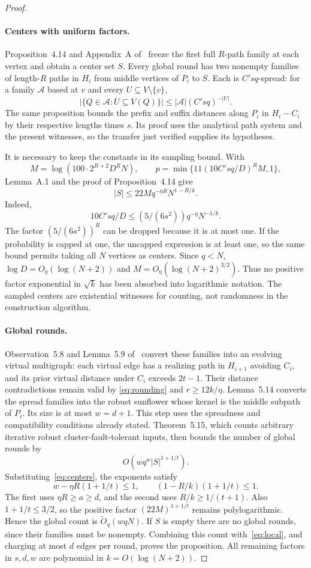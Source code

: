 \documentclass[acmsmall,11pt,screen,nonacm]{acmart}
\newcommand{\Ot}{\widetilde{O}}
\begin{document}
\begin{proof}
\paragraph{Centers with uniform factors.}
Proposition~4.14 and Appendix~A of~\cite{PPT26} freeze the first full
$R$-path family at each vertex and obtain a center set $S$. Every global
round has two nonempty families of length-$R$ paths in $H_i$ from middle
vertices of $P_i$ to $S$. Each is $C'sq$-spread: for a family
$\mathcal A$ based at $v$ and every $U\subseteq V\setminus\{v\}$,
\[
 |\{Q\in\mathcal A:U\subseteq V(Q)\}|\le
 |\mathcal A|(C'sq)^{-|U|}.
\]
The same proposition bounds the prefix and suffix distances along $P_i$
in $H_i-C_i$ by their respective lengths times $s$.
Its proof uses the analytical path system and the present witnesses, so
the transfer just verified supplies its hypotheses.

It is necessary to keep the constants in its sampling bound. With
\[
 M=\log(100\cdot2^{R+2}D^RN),\qquad
 p=\min\{11(10C'sq/D)^RM,1\},
\]
Lemma~A.1 and the proof of Proposition~4.14 give
\begin{equation}\label{eq:centers}
 |S|\le22M q^{-\eta R}N^{1-R/k}.
\end{equation}
Indeed,
\[
 10C'sq/D\le (5/(6s^2))q^{-\eta}N^{-1/k}.
\]
The factor $(5/(6s^2))^R$ can be dropped because it is at most one.
If the probability is capped at one, the uncapped expression is at least
one, so the same bound permits taking all $N$ vertices as centers.
Since $q<N$, $\log D=O_\eta(\log(N+2))$ and
$M=O_\eta(\log(N+2)^{3/2})$. Thus no positive factor exponential in
$\sqrt{k}$ has been absorbed into logarithmic notation. The sampled
centers are existential witnesses for counting, not randomness in the
construction algorithm.

\paragraph{Global rounds.}
Observation~5.8 and Lemma~5.9 of~\cite{PPT26} convert these families into
an evolving virtual multigraph: each virtual edge has a realizing path
in $H_{i+1}$ avoiding $C_i$, and its prior virtual distance under $C_i$
exceeds $2t-1$. Their distance contradictions remain valid by
\eqref{eq:rounding} and $r\ge12k/\eta$. Lemma~5.14 converts the spread
families into the robust sunflower whose kernel is the middle subpath
of $P_i$. Its size is at most $w=d+1$. This step uses the spreadness and
compatibility conditions already stated. Theorem~5.15, which counts
arbitrary iterative robust cluster-fault-tolerant inputs, then bounds
the number of global rounds by
\[
 O(wq^w|S|^{1+1/t}).
\]
Substituting~\eqref{eq:centers}, the exponents satisfy
\[
 w-\eta R(1+1/t)\le1,\qquad
 (1-R/k)(1+1/t)\le1.
\]
The first uses $\eta R\ge a\ge d$, and the second uses
$R/k\ge1/(t+1)$. Also $1+1/t\le3/2$, so the positive factor
$(22M)^{1+1/t}$ remains polylogarithmic. Hence the global count is
$\Ot_\eta(wqN)$. If $S$ is empty there are no global rounds, since their
families must be nonempty. Combining this count with~\eqref{eq:local},
and charging at most $d$ edges per round, proves the proposition. All
remaining factors in $s,d,w$ are polynomial in $k=O(\log(N+2))$.
\end{proof}
\end{document}
